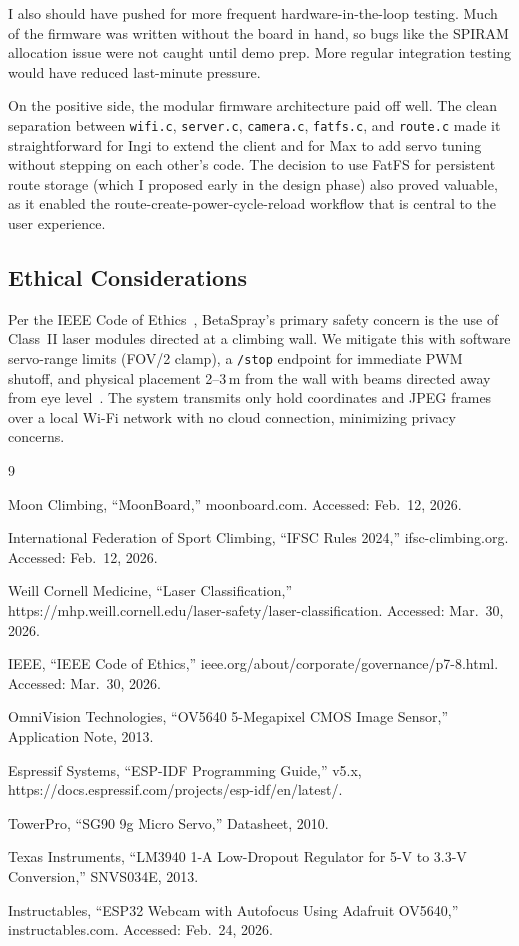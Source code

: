 \documentclass[12pt]{article}
\begin{document}
I also should have pushed for more frequent hardware-in-the-loop testing.
Much of the firmware was written without the board in hand, so bugs like the
SPIRAM allocation issue were not caught until demo prep.  More regular
integration testing would have reduced last-minute pressure.

On the positive side, the modular firmware architecture paid off well.  The
clean separation between \texttt{wifi.c}, \texttt{server.c}, \texttt{camera.c},
\texttt{fatfs.c}, and \texttt{route.c} made it straightforward for Ingi to
extend the client and for Max to add servo tuning without stepping on each
other's code.  The decision to use FatFS for persistent route storage (which
I proposed early in the design phase) also proved valuable, as it enabled
the route-create-power-cycle-reload workflow that is central to the user
experience.

\subsection{Ethical Considerations}

Per the IEEE Code of Ethics~\cite{ieee_ethics}, BetaSpray's primary safety
concern is the use of Class~II laser modules directed at a climbing wall.
We mitigate this with software servo-range limits (FOV/2 clamp), a
\texttt{/stop} endpoint for immediate PWM shutoff, and physical placement
2--3\,m from the wall with beams directed away from eye level~\cite{laser_safety}.
The system transmits only hold coordinates and JPEG frames over a local
Wi-Fi network with no cloud connection, minimizing privacy concerns.

\begin{thebibliography}{9}

Moon Climbing, ``MoonBoard,'' moonboard.com. Accessed: Feb.~12, 2026.

International Federation of Sport Climbing, ``IFSC Rules 2024,''
ifsc-climbing.org. Accessed: Feb.~12, 2026.

Weill Cornell Medicine, ``Laser Classification,''
https://mhp.weill.cornell.edu/laser-safety/laser-classification.
Accessed: Mar.~30, 2026.

IEEE, ``IEEE Code of Ethics,'' ieee.org/about/corporate/governance/p7-8.html.
Accessed: Mar.~30, 2026.

OmniVision Technologies, ``OV5640 5-Megapixel CMOS Image Sensor,''
Application Note, 2013.

Espressif Systems, ``ESP-IDF Programming Guide,'' v5.x,
https://docs.espressif.com/projects/esp-idf/en/latest/.

TowerPro, ``SG90 9g Micro Servo,'' Datasheet, 2010.

Texas Instruments, ``LM3940 1-A Low-Dropout Regulator for 5-V to 3.3-V
Conversion,'' SNVS034E, 2013.

Instructables, ``ESP32 Webcam with Autofocus Using Adafruit OV5640,''
instructables.com. Accessed: Feb.~24, 2026.

\end{thebibliography}
\end{document}
